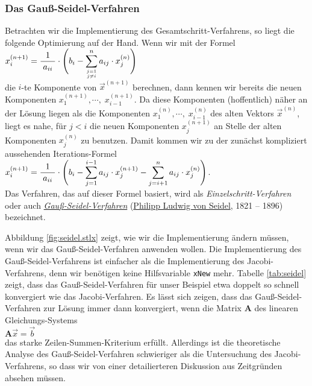 \subsubsection{Das Gau{\ss}-Seidel-Verfahren}
Betrachten wir die Implementierung des Gesamtschritt-Verfahrens, so liegt die folgende
Optimierung auf der Hand.  Wenn wir mit der Formel
\\[0.2cm]
\hspace*{1.3cm}
$x^{(n+1)}_i = \displaystyle \displaystyle\frac{\;\displaystyle1\;}{\;\displaystyle a_{ii}\;} \cdot  \Biggl( b_i - \sum\limits_{j=1 \atop j \not= i}^n a_{ij} \cdot  x^{(n)}_j \Biggr)$
\\[0.2cm]
die $i$-te Komponente von $\vec{x}^{(n+1)}$ berechnen, dann kennen wir bereits die
neuen Komponenten $x^{(n+1)}_1,\cdots,\;x^{(n+1)}_{i-1}$. Da diese Komponenten (hoffentlich) n\"aher an der
L\"osung liegen als die Komponenten $x^{(n)}_1,\cdots,\;x^{(n)}_{i-1}$ des alten Vektors
$\vec{x}^{(n)}$, liegt es nahe, f\"ur $j<i$ die neuen Komponenten $x_j^{(n+1)}$ an Stelle
der alten Komponenten $x_j^{(n)}$ zu benutzen.  Damit kommen
wir zu der zun\"achst kompliziert aussehenden Iterations-Formel 
\\[0.2cm]
\hspace*{1.3cm}
$x^{(n+1)}_i = \displaystyle \displaystyle\frac{\;\displaystyle1\;}{\;\displaystyle a_{ii}\;} \cdot  \Biggl( b_i - \sum\limits_{j=1}^{i-1} a_{ij} \cdot  x^{(n+1)}_j -
               \sum\limits_{j=i+1}^n a_{ij} \cdot  x^{(n)}_j \Biggr)$.
\\[0.2cm]
Das Verfahren, das auf dieser Formel basiert, wird als \emph{Einzelschritt-Verfahren} oder
auch 
\href{https://de.wikipedia.org/wiki/Einzelschrittverfahren}{\emph{Gau{\ss}-Seidel-Verfahren}} 
(\href{https://de.wikipedia.org/wiki/Philipp_Ludwig_von_Seidel}{Philipp Ludwig von Seidel}, 1821 -- 1896) bezeichnet.

Abbildung \ref{fig:seidel.stlx} zeigt, wie wir die Implementierung \"andern
m\"ussen, wenn wir das Gau{\ss}-Seidel-Verfahren anwenden wollen.  Die Implementierung des
Gau{\ss}-Seidel-Verfahrens ist einfacher als die Implementierung des Jacobi-Verfahrens, denn
wir ben\"otigen keine Hilfsvariable \texttt{xNew} mehr.
Tabelle \ref{tab:seidel} zeigt, dass das Gau{\ss}-Seidel-Verfahren f\"ur
unser Beispiel etwa doppelt so schnell konvergiert wie das Jacobi-Verfahren.
Es l\"asst sich zeigen, dass das Gau{\ss}-Seidel-Verfahren zur L\"osung immer dann konvergiert, wenn die Matrix
$\mathbf{A}$ des linearen Gleichungs-Systems
\\[0.2cm]
\hspace*{1.3cm}
$\mathbf{A} \vec{x} = \vec{b}$
\\[0.2cm]
das starke Zeilen-Summen-Kriterium erf\"ullt.  Allerdings ist die theoretische Analyse des
Gau{\ss}-Seidel-Verfahren schwieriger als die Untersuchung des Jacobi-Verfahrens, so dass wir von einer
detailierteren Diskussion aus Zeitgr\"unden absehen m\"ussen.

